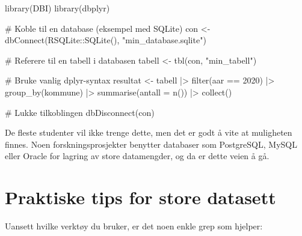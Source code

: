 \documentclass[
  norsk,
  letterpaper,
  DIV=11,
  numbers=noendperiod]{scrreprt}
\newenvironment{Shaded}{\begin{snugshade}}{\end{snugshade}}
\newcommand{\AttributeTok}[1]{\textcolor[rgb]{0.40,0.45,0.13}{#1}}
\newcommand{\CommentTok}[1]{\textcolor[rgb]{0.37,0.37,0.37}{#1}}
\newcommand{\DecValTok}[1]{\textcolor[rgb]{0.68,0.00,0.00}{#1}}
\newcommand{\FunctionTok}[1]{\textcolor[rgb]{0.28,0.35,0.67}{#1}}
\newcommand{\NormalTok}[1]{\textcolor[rgb]{0.00,0.23,0.31}{#1}}
\newcommand{\OtherTok}[1]{\textcolor[rgb]{0.00,0.23,0.31}{#1}}
\newcommand{\SpecialCharTok}[1]{\textcolor[rgb]{0.37,0.37,0.37}{#1}}
\newcommand{\StringTok}[1]{\textcolor[rgb]{0.13,0.47,0.30}{#1}}
\theoremstyle{definition}
\theoremstyle{remark}
\begin{document}
\begin{Shaded}
\begin{Highlighting}[]
\FunctionTok{library}\NormalTok{(DBI)}
\FunctionTok{library}\NormalTok{(dbplyr)}

\CommentTok{\# Koble til en database (eksempel med SQLite)}
\NormalTok{con }\OtherTok{\textless{}{-}} \FunctionTok{dbConnect}\NormalTok{(RSQLite}\SpecialCharTok{::}\FunctionTok{SQLite}\NormalTok{(), }\StringTok{"min\_database.sqlite"}\NormalTok{)}

\CommentTok{\# Referere til en tabell i databasen}
\NormalTok{tabell }\OtherTok{\textless{}{-}} \FunctionTok{tbl}\NormalTok{(con, }\StringTok{"min\_tabell"}\NormalTok{)}

\CommentTok{\# Bruke vanlig dplyr{-}syntax}
\NormalTok{resultat }\OtherTok{\textless{}{-}}\NormalTok{ tabell }\SpecialCharTok{|\textgreater{}}
  \FunctionTok{filter}\NormalTok{(aar }\SpecialCharTok{==} \DecValTok{2020}\NormalTok{) }\SpecialCharTok{|\textgreater{}}
  \FunctionTok{group\_by}\NormalTok{(kommune) }\SpecialCharTok{|\textgreater{}}
  \FunctionTok{summarise}\NormalTok{(}\AttributeTok{antall =} \FunctionTok{n}\NormalTok{()) }\SpecialCharTok{|\textgreater{}}
  \FunctionTok{collect}\NormalTok{()}

\CommentTok{\# Lukke tilkoblingen}
\FunctionTok{dbDisconnect}\NormalTok{(con)}
\end{Highlighting}
\end{Shaded}

De fleste studenter vil ikke trenge dette, men det er godt å vite at
muligheten finnes. Noen forskningsprosjekter benytter databaser som
PostgreSQL, MySQL eller Oracle for lagring av store datamengder, og da
er dette veien å gå.

\section{Praktiske tips for store
datasett}\label{praktiske-tips-for-store-datasett}

Uansett hvilke verktøy du bruker, er det noen enkle grep som hjelper:
\end{document}
